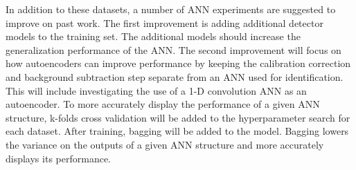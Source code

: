 \documentclass[tocnosub,noragright,centerchapter,12pt,fullpage]{uiucecethesis09}
\begin{document}
In addition to these datasets, a number of ANN experiments are suggested to improve on past work. The first improvement is adding additional detector models to the training set. The additional models should increase the generalization performance of the ANN. The second improvement will focus on how autoencoders can improve performance by keeping the calibration correction and background subtraction step separate from an ANN used for identification. This will include investigating the use of a 1-D convolution ANN as an autoencoder. To more accurately display the performance of a given ANN structure, k-folds cross validation will be added to the hyperparameter search for each dataset. After training, bagging  will be added to the model. Bagging lowers the variance on the outputs of a given ANN structure and more accurately displays its performance.










\end{document}
